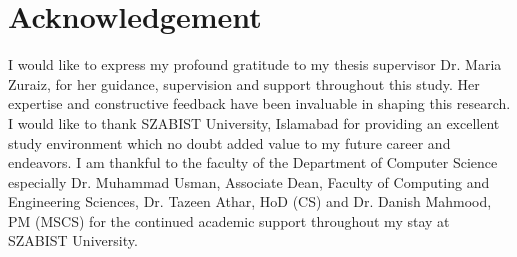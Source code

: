 \documentclass[12pt,a4paper]{report}
\numberwithin{equation}{section}
\begin{document}
    \chapter*{Acknowledgement} %
    \markboth{}{}
    \label{ack:acknowledgement}    
    \normalsize {I would like to express my profound gratitude to my thesis supervisor Dr. Maria Zuraiz, for her guidance, supervision and support throughout this study. Her expertise and constructive feedback have been invaluable in shaping this research. I would like to thank SZABIST University, Islamabad for providing an excellent study environment which no doubt added value to my future career and endeavors. I am thankful to the faculty of the Department of Computer Science especially Dr. Muhammad Usman, Associate Dean, Faculty of Computing and Engineering Sciences, Dr. Tazeen Athar, HoD (CS) and Dr. Danish Mahmood, PM (MSCS) for the continued academic support throughout my stay at SZABIST University.}
    
    \newpage
    
\end{document}

